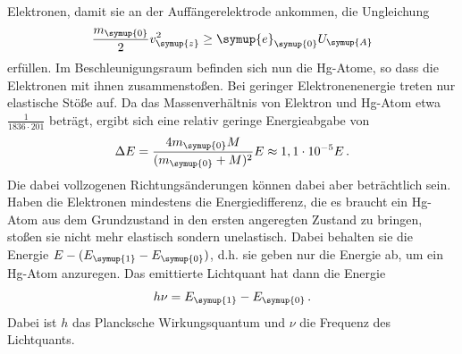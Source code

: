 Elektronen, damit sie an der Auffängerelektrode ankommen, die Ungleichung
\begin{equation}
    \label{eqn:E_Ungleichung}
    \frac{m_{\symup{0}}}{2} v_{\symup{z}}^2 \geq \symup{e}_{\symup{0}} U_{\symup{A}}
\end{equation}
erfüllen. Im Beschleunigungsraum befinden sich nun die Hg-Atome, so dass die Elektronen mit ihnen zusammenstoßen.
Bei geringer Elektronenenergie treten nur elastische Stöße auf. Da das Massenverhältnis von Elektron und Hg-Atom
etwa $\frac{1}{1836 \cdot 201}$ beträgt, ergibt sich eine relativ geringe Energieabgabe von
\begin{equation}
    \label{eqn:EnergieAbgabe}
    \Delta E = \frac{4 m_{\symup{0}} M}{(m_{\symup{0}} + M)^2} E \approx 1,1\cdot 10^{-5} E\,.
\end{equation}
Die dabei vollzogenen Richtungsänderungen können dabei aber beträchtlich sein. Haben die Elektronen mindestens die
Energiedifferenz, die es braucht ein Hg-Atom aus dem Grundzustand in den ersten angeregten Zustand zu bringen,
stoßen sie nicht mehr elastisch sondern unelastisch. Dabei behalten sie die Energie $E - (E_{\symup{1}} - 
E_{\symup{0}})$, d.h. sie geben nur die Energie ab, um ein Hg-Atom anzuregen. Das emittierte Lichtquant hat dann
die Energie
\begin{equation}
    \label{eqn:Emission}
    h\nu = E_{\symup{1}} - E_{\symup{0}}\,.
\end{equation}
Dabei ist $h$ das Plancksche Wirkungsquantum und $\nu$ die Frequenz des Lichtquants.
